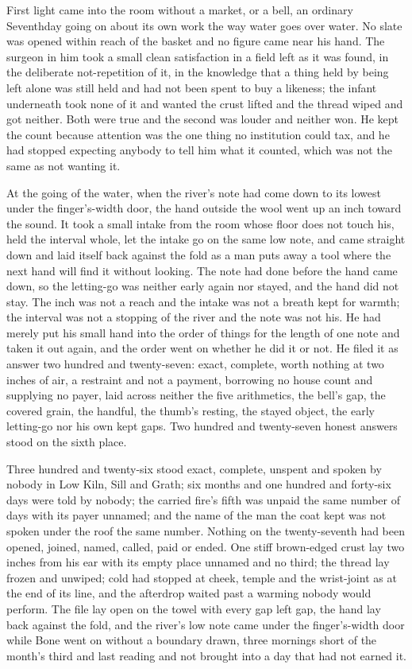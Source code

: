 First light came into the room without a market,  or a bell, an ordinary Seventhday going on about its own work the way water goes over water. No slate was opened within reach of the basket and no figure came near his hand. The surgeon in him took a small clean satisfaction in a field left as it was found, in the deliberate not-repetition of it, in the knowledge that a thing held by being left alone was still held and had not been spent to buy a likeness; the infant underneath took none of it and wanted the crust lifted and the thread wiped and got neither. Both were true and the second was louder and neither won. He kept the count because attention was the one thing no institution could tax, and he had stopped expecting anybody to tell him what it counted, which was not the same as not wanting it.

At the going of the water, when the river's note had come down to its lowest under the finger's-width door, the hand outside the wool went up an inch toward the sound. It took a small intake from the room whose floor does not touch his, held the interval whole, let the intake go on the same low note, and came straight down and laid itself back against the fold as a man puts away a tool where the next hand will find it without looking. The note had done before the hand came down, so the letting-go was neither early again nor stayed, and the hand did not stay. The inch was not a reach and the intake was not a breath kept for warmth; the interval was not a stopping of the river and the note was not his. He had merely put his small hand into the order of things for the length of one note and taken it out again, and the order went on whether he did it or not. He filed it as answer two hundred and twenty-seven: exact, complete, worth nothing at two inches of air, a restraint and not a payment, borrowing no house count and supplying no payer, laid across neither the five arithmetics, the bell's gap, the covered grain, the handful, the thumb's resting, the stayed object, the early letting-go nor his own kept gaps. Two hundred and twenty-seven honest answers stood on the sixth place.

Three hundred and twenty-six stood exact, complete, unspent and spoken by nobody in Low Kiln, Sill and Grath; six months and one hundred and forty-six days were told by nobody; the carried fire's fifth was unpaid the same number of days with its payer unnamed; and the name of the man the coat kept was not spoken under the roof the same number. Nothing on the twenty-seventh had been opened, joined, named, called, paid or ended. One stiff brown-edged crust lay two inches from his ear with its empty place unnamed and no third; the thread lay frozen and unwiped; cold had stopped at cheek, temple and the wrist-joint as at the end of its line, and the afterdrop waited past a warming nobody would perform. The file lay open on the towel with every gap left gap, the hand lay back against the fold, and the river's low note came under the finger's-width door while Bone went on without a boundary drawn, three mornings short of the month's third and last reading and not brought into a day that had not earned it.
